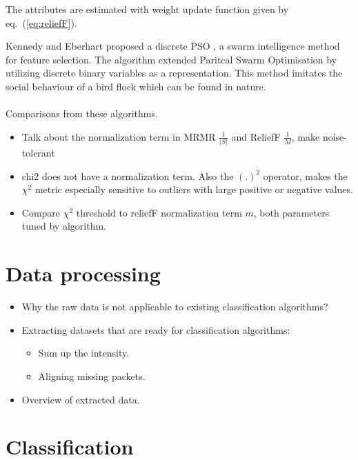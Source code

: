 \documentclass[runningheads]{llncs}
\begin{document}
The attributes are estimated with weight update function given by eq.~(\ref{eq:reliefF}). 


Kennedy and Eberhart proposed a discrete PSO \cite{kennedy1997discrete}, a swarm intelligence method for feature selection. 
The algorithm extended Paritcal Swarm Optimisation \cite{kennedy1995particle} by utilizing discrete binary variables as a representation. 
This method imitates the social behaviour of a bird flock which can be found in nature. 
\\\\
Comparisons from these algorithms. 
\begin{itemize}
  \item Talk about the normalization term in MRMR $\frac{1}{|S|}$ and ReliefF $\frac{1}{M}$, make noise-tolerant
  \item chi2 does not have a normalization term. Also the $(.)^2$ operator, makes the $\chi^2$ metric especially sensitive to outliers with large positive or negative values. 
  \item Compare $\chi^2$ threshold to reliefF normalization term $m$, both parameters tuned by algorithm. 
\end{itemize}

\section{Data processing}


\begin{itemize}
  \item Why the raw data is not applicable to existing classification algorithms?
  \item Extracting datasets that are ready for classification algorithms:
        \begin{itemize}
          \item Sum up the intensity.
          \item Aligning missing packets.
        \end{itemize}
  \item Overview of extracted data.
\end{itemize}

\section{Classification}
\end{document}
